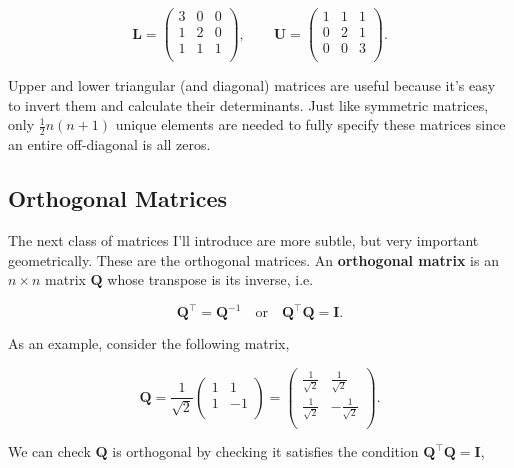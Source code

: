 \documentclass[
  letterpaper,
  DIV=11,
  numbers=noendperiod]{scrreprt}
\begin{document}
\[
\mathbf{L} = 
\begin{pmatrix}
3 & 0 & 0 \\
1 & 2 & 0 \\
1 & 1 & 1 \\
\end{pmatrix}, \qquad \mathbf{U} = 
\begin{pmatrix}
1 & 1 & 1 \\
0 & 2 & 1 \\
0 & 0 & 3 \\
\end{pmatrix}.
\]

Upper and lower triangular (and diagonal) matrices are useful because
it's easy to invert them and calculate their determinants. Just like
symmetric matrices, only \(\frac{1}{2}n(n+1)\) unique elements are
needed to fully specify these matrices since an entire off-diagonal is
all zeros.

\hypertarget{orthogonal-matrices}{%
\subsection{Orthogonal Matrices}\label{orthogonal-matrices}}

The next class of matrices I'll introduce are more subtle, but very
important geometrically. These are the orthogonal matrices. An
\textbf{orthogonal matrix} is an \(n \times n\) matrix \(\mathbf{Q}\)
whose transpose is its inverse, i.e.

\[\mathbf{Q}^\top = \mathbf{Q}^{-1} \quad \text{or} \quad \mathbf{Q}^\top \mathbf{Q}=\mathbf{I}.\]

As an example, consider the following matrix,

\[
\mathbf{Q} = \frac{1}{\sqrt{2}}
\begin{pmatrix}
1 & 1 \\
1 & -1 \\
\end{pmatrix} = 
\begin{pmatrix}
\frac{1}{\sqrt{2}} & \frac{1}{\sqrt{2}} \\
\frac{1}{\sqrt{2}} & -\frac{1}{\sqrt{2}} \\
\end{pmatrix}.
\]

We can check \(\mathbf{Q}\) is orthogonal by checking it satisfies the
condition \(\mathbf{Q}^\top \mathbf{Q}=\mathbf{I}\),
\end{document}
